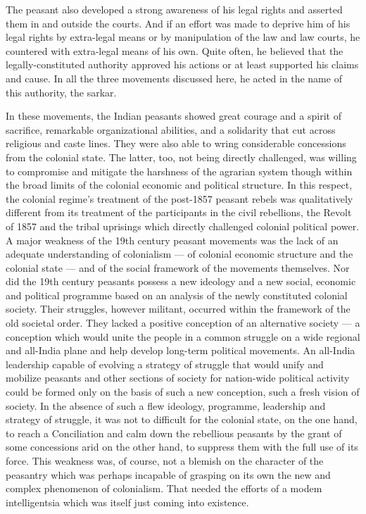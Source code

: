 \begin{multicols}{2}
The peasant also developed a strong awareness of his legal rights and asserted them in and outside the courts. And if an effort was made to deprive him of his legal rights by extra-legal means or by manipulation of the law and law courts, he countered with extra-legal means of his own. Quite often, he believed that the legally-constituted authority approved his actions or at least supported his claims and cause. In all the three movements discussed here, he acted in the name of this authority, the sarkar.

In these movements, the Indian peasants showed great courage and a spirit of sacrifice, remarkable organizational abilities, and a solidarity that cut across religious and caste lines. They were also able to wring considerable concessions from the colonial state. The latter, too, not being directly challenged, was willing to compromise and mitigate the harshness of the agrarian system though within the broad limits of the colonial economic and political structure. In this respect, the colonial regime's treatment of the post-1857 peasant rebels was qualitatively different from its treatment of the participants in the civil rebellions, the Revolt of 1857 and the tribal uprisings which directly challenged colonial political power. A major weakness of the 19th century peasant movements was the lack of an adequate understanding of colonialism --- of colonial economic structure and the colonial state --- and of the social framework of the movements themselves. Nor did the 19th century peasants possess a new ideology and a new social, economic and political programme based on an analysis of the newly constituted colonial society. Their struggles, however militant, occurred within the framework of the old societal order. They lacked a positive conception of an alternative society --- a conception which would unite the people in a common struggle on a wide regional and all-India plane and help develop long-term political movements. An all-India leadership capable of evolving a strategy of struggle that would unify and mobilize peasants and other sections of society for nation-wide political activity could be formed only on the basis of such a new conception, such a fresh vision of society. In the absence of such a flew ideology, programme, leadership and strategy of struggle, it was not to difficult for the colonial state, on the one hand, to reach a Conciliation and calm down the rebellious peasants by the grant of some concessions arid on the other hand, to suppress them with the full use of its force. This weakness was, of course, not a blemish on the character of the peasantry which was perhaps incapable of grasping on its own the new and complex phenomenon of colonialism. That needed the efforts of a modem intelligentsia which was itself just coming into existence.


\end{multicols}
